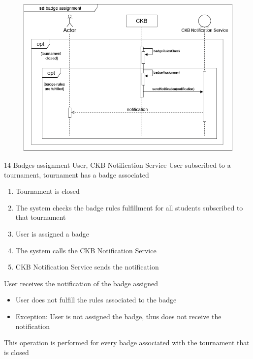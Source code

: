 \usecase
{
    \begin{figure}[H]
        \centering
        \includegraphics[width=\textwidth]{src/sequence_diagrams/badgeassignment.png}
    \end{figure}
}
{14}
{Badges assignment} %
{User, CKB Notification Service} %
{User subscribed to a tournament, tournament has a badge associated} %
{ %
    \begin{enumerate}
        \item Tournament is closed
        \item The system checks the badge rules fulfillment for all students subscribed to that tournament
        \item User is assigned a badge
        \item The system calls the CKB Notification Service 
        \item CKB Notification Service sends the notification
    \end{enumerate}
}
{User receives the notification of the badge assigned} %
{ %
    \begin{itemize}
        \item User does not fulfill the rules associated to the badge
    \end{itemize}
}
{ %
    \begin{itemize}
        \item Exception: User is not assigned the badge, thus does not receive the notification
    \end{itemize}
    This operation is performed for every badge associated with the tournament that is closed
}





